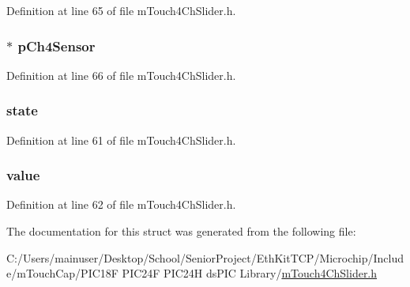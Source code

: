 Definition at line 65 of file m\+Touch4\+Ch\+Slider.\+h.

\hypertarget{structtag___m_t_o_u_c_h4_c_h_s_l_i_d_e_r_ae56a74b10ecd9f4405f2e80247a3ee88}{}
\subsubsection[{p\+Ch4\+Sensor}]{$\ast$ p\+Ch4\+Sensor}\label{structtag___m_t_o_u_c_h4_c_h_s_l_i_d_e_r_ae56a74b10ecd9f4405f2e80247a3ee88}


Definition at line 66 of file m\+Touch4\+Ch\+Slider.\+h.

\hypertarget{structtag___m_t_o_u_c_h4_c_h_s_l_i_d_e_r_a6e9c4cbd32a1178b12f3a61f6855c896}{}
\subsubsection[{state}]{ state}\label{structtag___m_t_o_u_c_h4_c_h_s_l_i_d_e_r_a6e9c4cbd32a1178b12f3a61f6855c896}


Definition at line 61 of file m\+Touch4\+Ch\+Slider.\+h.

\hypertarget{structtag___m_t_o_u_c_h4_c_h_s_l_i_d_e_r_aedc7c0025d092e92a4cc5132a9a0634c}{}
\subsubsection[{value}]{ value}\label{structtag___m_t_o_u_c_h4_c_h_s_l_i_d_e_r_aedc7c0025d092e92a4cc5132a9a0634c}


Definition at line 62 of file m\+Touch4\+Ch\+Slider.\+h.



The documentation for this struct was generated from the following file\+:\begin{DoxyCompactItemize}
\item 
C\+:/\+Users/mainuser/\+Desktop/\+School/\+Senior\+Project/\+Eth\+Kit\+T\+C\+P/\+Microchip/\+Include/m\+Touch\+Cap/\+P\+I\+C18\+F P\+I\+C24\+F P\+I\+C24\+H ds\+P\+I\+C Library/\hyperlink{m_touch4_ch_slider_8h}{m\+Touch4\+Ch\+Slider.\+h}\end{DoxyCompactItemize}
